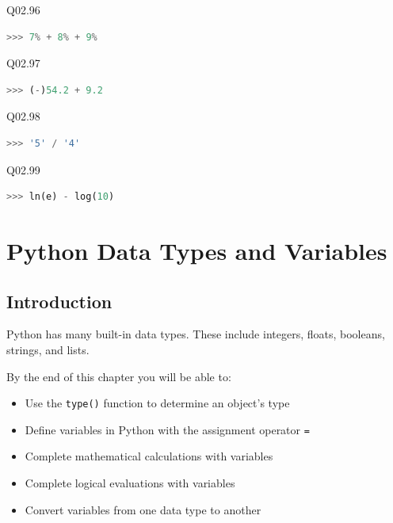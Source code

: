\documentclass{book}
\begin{document}
Q02.96

\begin{lstlisting}[language=Python]
>>> 7% + 8% + 9%
\end{lstlisting}

Q02.97

\begin{lstlisting}[language=Python]
>>> (-)54.2 + 9.2
\end{lstlisting}

Q02.98

\begin{lstlisting}[language=Python]
>>> '5' / '4'
\end{lstlisting}

Q02.99

\begin{lstlisting}[language=Python]
>>> ln(e) - log(10)
\end{lstlisting}
    




    
        \chapter{Python Data Types and
Variables}\label{python-data-types-and-variables}
    




    
        \section{Introduction}\label{introduction}

Python has many built-in data types. These include integers, floats,
booleans, strings, and lists.

By the end of this chapter you will be able to:

\begin{itemize}
\item
  Use the \lstinline!type()! function to determine an object's type
\item
  Define variables in Python with the assignment operator \lstinline!=!
\item
  Complete mathematical calculations with variables
\item
  Complete logical evaluations with variables
\item
  Convert variables from one data type to another
\end{itemize}
        \newpage
\end{document}
